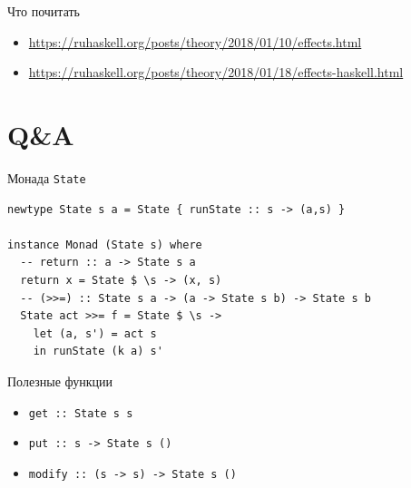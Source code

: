 \documentclass{beamer}
\newcommand{\hs}[1]{\texttt{#1}}
\begin{document}
\begin{frame}{Что почитать}
    \begin{itemize}
        \item \url{https://ruhaskell.org/posts/theory/2018/01/10/effects.html}
        \item \url{https://ruhaskell.org/posts/theory/2018/01/18/effects-haskell.html}
    \end{itemize}
\end{frame}
  \section{Q\&A}
  \appendix
  \begin{frame}[fragile]{Монада \texttt{State}}
\begin{verbatim}
newtype State s a = State { runState :: s -> (a,s) }

instance Monad (State s) where
  -- return :: a -> State s a
  return x = State $ \s -> (x, s)
  -- (>>=) :: State s a -> (a -> State s b) -> State s b
  State act >>= f = State $ \s ->
    let (a, s') = act s
    in runState (k a) s'
\end{verbatim}
\begin{block}{Полезные функции}
\begin{itemize}
    \item \hs{get       :: State s s}
    \item \hs{put       :: s -> State s ()}
    \item \hs{modify    :: (s -> s) -> State s ()}
\end{itemize}
\end{block}
  \end{frame}
\end{document}
